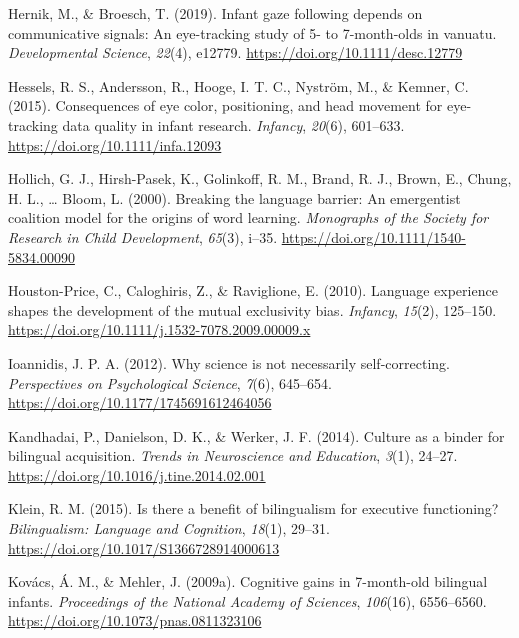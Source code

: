 \documentclass[
  english,
  ,man,floatsintext]{apa6}
\begin{document}
\leavevmode\hypertarget{ref-Hernik_Broesch_2019}{}%
Hernik, M., \& Broesch, T. (2019). Infant gaze following depends on communicative signals: An eye-tracking study of 5- to 7-month-olds in vanuatu. \emph{Developmental Science}, \emph{22}(4), e12779. \url{https://doi.org/10.1111/desc.12779}

\leavevmode\hypertarget{ref-Hessels_etal_2015}{}%
Hessels, R. S., Andersson, R., Hooge, I. T. C., Nyström, M., \& Kemner, C. (2015). Consequences of eye color, positioning, and head movement for eye-tracking data quality in infant research. \emph{Infancy}, \emph{20}(6), 601--633. \url{https://doi.org/10.1111/infa.12093}

\leavevmode\hypertarget{ref-Hollich_etal_2000}{}%
Hollich, G. J., Hirsh-Pasek, K., Golinkoff, R. M., Brand, R. J., Brown, E., Chung, H. L., \ldots{} Bloom, L. (2000). Breaking the language barrier: An emergentist coalition model for the origins of word learning. \emph{Monographs of the Society for Research in Child Development}, \emph{65}(3), i--35. \url{https://doi.org/10.1111/1540-5834.00090}

\leavevmode\hypertarget{ref-Houston-Price_etal_2010}{}%
Houston-Price, C., Caloghiris, Z., \& Raviglione, E. (2010). Language experience shapes the development of the mutual exclusivity bias. \emph{Infancy}, \emph{15}(2), 125--150. \url{https://doi.org/10.1111/j.1532-7078.2009.00009.x}

\leavevmode\hypertarget{ref-Ioannidis_2012}{}%
Ioannidis, J. P. A. (2012). Why science is not necessarily self-correcting. \emph{Perspectives on Psychological Science}, \emph{7}(6), 645--654. \url{https://doi.org/10.1177/1745691612464056}

\leavevmode\hypertarget{ref-Kandhadai_etal_2014}{}%
Kandhadai, P., Danielson, D. K., \& Werker, J. F. (2014). Culture as a binder for bilingual acquisition. \emph{Trends in Neuroscience and Education}, \emph{3}(1), 24--27. \url{https://doi.org/10.1016/j.tine.2014.02.001}

\leavevmode\hypertarget{ref-Klein_2015}{}%
Klein, R. M. (2015). Is there a benefit of bilingualism for executive functioning? \emph{Bilingualism: Language and Cognition}, \emph{18}(1), 29--31. \url{https://doi.org/10.1017/S1366728914000613}

\leavevmode\hypertarget{ref-Kovacs_Mehler_2009b}{}%
Kovács, Á. M., \& Mehler, J. (2009a). Cognitive gains in 7-month-old bilingual infants. \emph{Proceedings of the National Academy of Sciences}, \emph{106}(16), 6556--6560. \url{https://doi.org/10.1073/pnas.0811323106}
\end{document}
